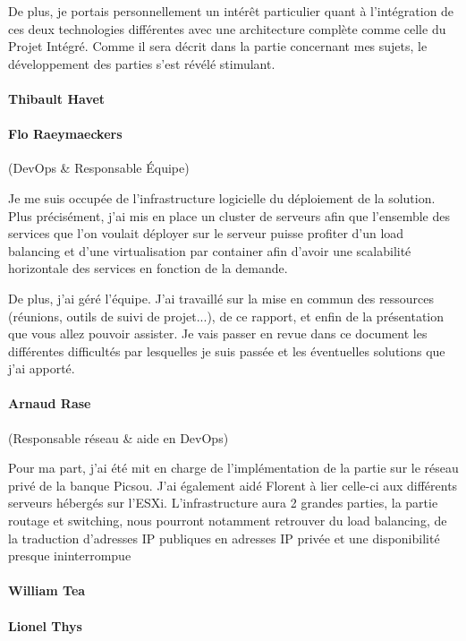 De plus, je portais personnellement un intérêt particulier quant à l'intégration de ces deux technologies différentes avec une architecture complète comme celle du Projet Intégré. Comme il sera décrit dans la partie concernant mes sujets, le développement des parties s'est révélé stimulant. 

\paragraph{Thibault Havet}
\paragraph{Flo Raeymaeckers} (DevOps \& Responsable Équipe)

Je me suis occupée de l'infrastructure logicielle du déploiement de la solution. Plus précisément, j'ai mis en place un cluster de serveurs afin que l'ensemble des services que l'on voulait déployer sur le serveur puisse profiter d'un load balancing et d'une virtualisation par container afin d'avoir une scalabilité horizontale des services en fonction de la demande.

De plus, j'ai géré l'équipe. J'ai travaillé sur la mise en commun des ressources (réunions, outils de suivi de projet...), de ce rapport, et enfin de la présentation que vous allez pouvoir assister. Je vais passer en revue dans ce document les différentes difficultés par lesquelles je suis passée et les éventuelles solutions que j'ai apporté.

\paragraph{Arnaud Rase} (Responsable réseau \& aide en DevOps)

Pour ma part, j'ai été mit en charge de l'implémentation de la partie sur le réseau privé de la
banque Picsou. J'ai également aidé Florent à lier celle-ci aux différents serveurs hébergés sur
l'ESXi. L'infrastructure aura 2 grandes parties, la partie routage et switching, nous pourront
notamment retrouver du load balancing, de la traduction d'adresses IP publiques en adresses
IP privée et une disponibilité presque ininterrompue

\paragraph{William Tea}
\paragraph{Lionel Thys}
